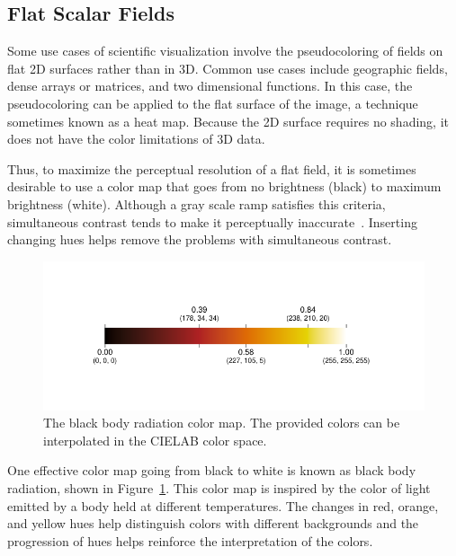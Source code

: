 \documentclass[letterpaper,twocolumn,fleqn]{article}
\newcommand*{\lcite}[1]{~\cite{#1}}
\begin{document}
\subsection{Flat Scalar Fields}

\noindent
Some use cases of scientific visualization involve the pseudocoloring of
fields on flat 2D surfaces rather than in 3D. Common use cases include
geographic fields, dense arrays or matrices, and two dimensional functions.
In this case, the pseudocoloring can be applied to the flat surface of the
image, a technique sometimes known as a heat map. Because the 2D surface
requires no shading, it does not have the color limitations of 3D data.

Thus, to maximize the perceptual resolution of a flat field, it is
sometimes desirable to use a color map that goes from no brightness (black)
to maximum brightness (white). Although a gray scale ramp satisfies this
criteria, simultaneous contrast tends to make it perceptually
inaccurate\lcite{Ware2004}. Inserting changing hues helps remove the
problems with simultaneous contrast.

\begin{figure}[htb]
  \centering
  \includegraphics[width=\linewidth,trim=0.69in 0.62in 0.76in 0.62in]
                  {ipython/BlackBodyMap}
  \caption{The black body radiation color map. The provided colors can be
    interpolated in the CIELAB color space.}
  \label{fig:BlackBodyRadiationColorBar}
\end{figure}

One effective color map going from black to white is known as black
body radiation, shown in Figure~\ref{fig:BlackBodyRadiationColorBar}. This
color map is inspired by the color of light emitted by a body held at
different temperatures. The changes in red, orange, and yellow hues help
distinguish colors with different backgrounds and the progression of hues
helps reinforce the interpretation of the colors.
\end{document}
